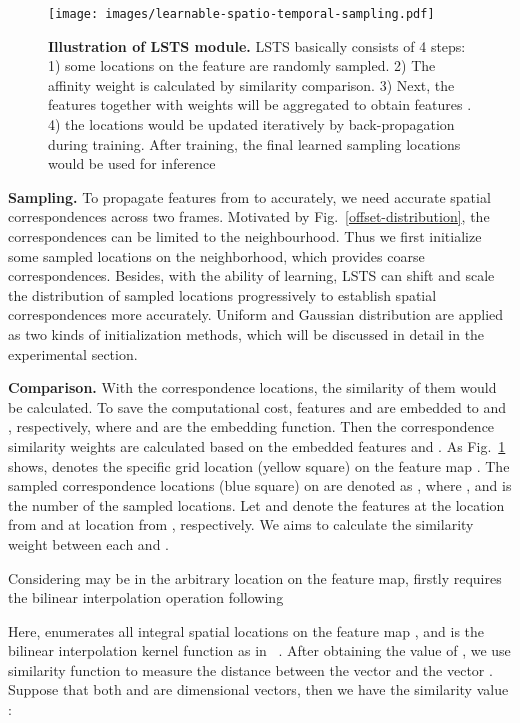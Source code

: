 \documentclass[runningheads]{llncs}
\begin{document}
\begin{figure}[t]
\centering
\texttt{[image: images/learnable-spatio-temporal-sampling.pdf]}
\caption{
\textbf{Illustration of LSTS module.} 
LSTS basically consists of 4 steps: 1) some locations on the feature are randomly sampled. 2) The affinity weight is calculated by similarity comparison. 3) Next, the features  together with weights will be aggregated to obtain features . 4) the locations would be updated iteratively by back-propagation during training.
After training, the final learned sampling locations would be used for inference}
\label{lsts-module}
\end{figure}

\noindent \textbf{Sampling.} To propagate features from  to  accurately, we need accurate spatial correspondences across two frames. Motivated by Fig.~\ref{offset-distribution}, the correspondences can be limited to the neighbourhood. Thus we first initialize some sampled locations on the neighborhood, which provides coarse correspondences. Besides, with the ability of learning, LSTS can shift and scale the distribution of sampled locations progressively to establish spatial correspondences more accurately. Uniform and Gaussian distribution are applied as two kinds of initialization methods, which will be discussed in detail in the experimental section.

\noindent \textbf{Comparison.}
With the correspondence locations, the similarity of them would be calculated. To save the computational cost, features  and  are embedded to  and , respectively, where  and  are the embedding function. 
Then the correspondence similarity weights are calculated based on the embedded features  and .
As Fig.~\ref{lsts-module} shows,  denotes the specific grid location (yellow square) on the feature map . The sampled correspondence locations (blue square) on  are denoted as , where , and  is the number of the sampled locations. Let  and  denote the features at the location  from  and at location  from , respectively. We aims to calculate the similarity weight between each  and .

Considering  may be in the arbitrary location on the feature map,  firstly requires the bilinear interpolation operation following

Here,  enumerates all integral spatial locations on the feature map , and  is the bilinear interpolation kernel function as in ~\cite{dai2017deformable}.
After obtaining the value of , we use similarity function  to measure the distance between the vector  and the vector . Suppose that both  and  are  dimensional vectors, then we have the similarity value :
\end{document}
